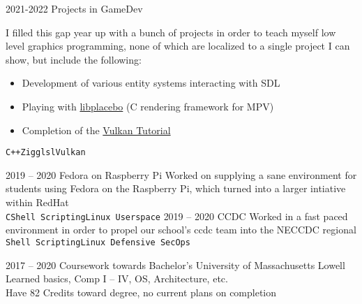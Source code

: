 \documentclass[9pt]{developercv} %
\begin{document}

\begin{entrylist}
	\entry
		{2021-2022}
		{Projects in GameDev}
        {}
        {I filled this gap year up with a bunch of projects in order to teach myself low level graphics programming,
        none of which are localized to a single project I can show, but include the following:
        \begin{itemize}\itemsep=0em
            \item Development of various entity systems interacting with SDL
            \item Playing with \href{https://github.com/haasn/libplacebo}{libplacebo} (C rendering framework for MPV)
            \item Completion of the \href{https://github.com/Codom/Vulkan-Tutorial}{Vulkan Tutorial}
        \end{itemize}
        \texttt{C++}\slashsep\texttt{Zig}\slashsep\texttt{glsl}\slashsep\texttt{Vulkan}}
	\entry
		{2019 -- 2020}
		{Fedora on Raspberry Pi}
        {}
        {Worked on supplying a sane environment for students using Fedora on the Raspberry Pi,
        which turned into a larger intiative within RedHat \\
        \texttt{C}\slashsep\texttt{Shell Scripting}\slashsep\texttt{Linux Userspace}}
	\entry
		{2019 -- 2020}
		{CCDC}
        {}
        {Worked in a fast paced environment in order to propel our school's ccdc team into
        the NECCDC regional\\
        \texttt{Shell Scripting}\slashsep\texttt{Linux Defensive SecOps}}
\end{entrylist}




\begin{entrylist}
	\entry
		{2017 -- 2020}
		{Coursework towards Bachelor's}
		{University of Massachusetts Lowell}
		{
            Learned basics, Comp I -- IV, OS, Architecture, etc. \\
            Have 82 Credits toward degree, no current plans on completion
        }
\end{entrylist}
\end{document}
